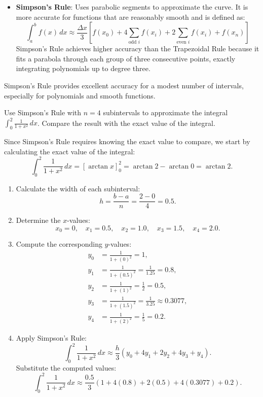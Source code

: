 \begin{itemize}
\begin{itemize}
\item \textbf{Simpson's Rule}:  Uses parabolic segments to approximate the curve. It is more accurate for functions that are reasonably smooth and is defined as:
\[
\int_a^b f(x) \, dx \approx \frac{\Delta x}{3} \left[ f(x_0) + 4\sum_{\text{odd } i} f(x_i) + 2\sum_{\text{even } i} f(x_i) + f(x_n) \right]
\]
Simpson’s Rule achieves higher accuracy than the Trapezoidal Rule because it fits a parabola through each group of three consecutive points, exactly integrating polynomials up to degree three.
\end{itemize}
Simpson’s Rule provides excellent accuracy for a modest number of intervals, especially for polynomials and smooth functions.


\exampleline
\begin{example}
Use Simpson's Rule with \( n = 4 \) subintervals to approximate the integral \( \int_0^{2} \frac{1}{1 + x^2} \, dx \). Compare the result with the exact value of the integral.

\begin{solution}
Since Simpson's Rule requires knowing the exact value to compare, we start by calculating the exact value of the integral:
\[
\int_0^{2} \frac{1}{1 + x^2} \, dx = \left[ \arctan x \right]_0^2 = \arctan 2 - \arctan 0 = \arctan 2.
\]

\begin{enumerate}
    \item Calculate the width of each subinterval:
    \[
    h = \frac{b - a}{n} = \frac{2 - 0}{4} = 0.5.
    \]

    \item Determine the \( x \)-values:
    \[
    x_0 = 0,\quad x_1 = 0.5,\quad x_2 = 1.0,\quad x_3 = 1.5,\quad x_4 = 2.0.
    \]

    \item Compute the corresponding \( y \)-values:
    \begin{align*}
    y_0 &= \frac{1}{1 + (0)^2} = 1, \\
    y_1 &= \frac{1}{1 + (0.5)^2} = \frac{1}{1.25} = 0.8, \\
    y_2 &= \frac{1}{1 + (1)^2} = \frac{1}{2} = 0.5, \\
    y_3 &= \frac{1}{1 + (1.5)^2} = \frac{1}{3.25} \approx 0.3077, \\
    y_4 &= \frac{1}{1 + (2)^2} = \frac{1}{5} = 0.2.
    \end{align*}

    \item Apply Simpson's Rule:
    \[
    \int_0^{2} \frac{1}{1 + x^2} \, dx \approx \frac{h}{3} \left( y_0 + 4y_1 + 2y_2 + 4y_3 + y_4 \right).
    \]
    Substitute the computed values:
    \[
    \int_0^{2} \frac{1}{1 + x^2} \, dx \approx \frac{0.5}{3} \left( 1 + 4(0.8) + 2(0.5) + 4(0.3077) + 0.2 \right).
    \]


\end{enumerate}
\end{solution}
\end{example}
\end{itemize}
